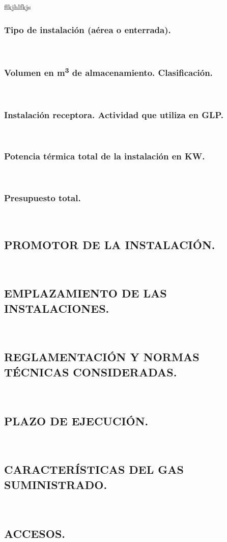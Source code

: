 \documentclass[12pt]{article}
\begin{document}
            flkjhlfkjs
            ~
            \subsubsection{Tipo de instalación (aérea o enterrada).}
            ~
            \subsubsection{Volumen en \texorpdfstring{m\textsuperscript{3}}{m³} de almacenamiento. Clasificación.}
            ~
            \subsubsection{Instalación receptora. Actividad que utiliza en GLP.}
            ~
            \subsubsection{Potencia térmica total de la instalación en KW.}
            ~
            \subsubsection{Presupuesto total.}
            ~
        
        \subsection{PROMOTOR DE LA INSTALACIÓN.}
        ~
        \subsection{EMPLAZAMIENTO DE LAS INSTALACIONES.}
        ~

        \clearpage
        \subsection{REGLAMENTACIÓN Y NORMAS TÉCNICAS CONSIDERADAS.}
        ~
        \subsection{PLAZO DE EJECUCIÓN.}
        ~
        \subsection{CARACTERÍSTICAS DEL GAS SUMINISTRADO.}
        ~
        \subsection{ACCESOS.}
        ~
\end{document}
